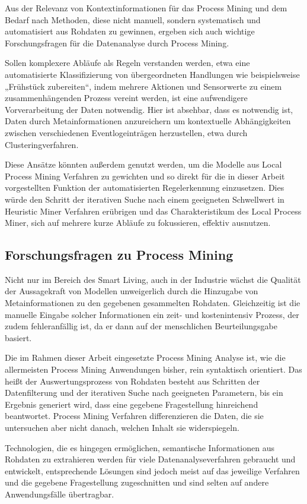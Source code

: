 Aus der Relevanz von Kontextinformationen für das Process Mining und dem Bedarf nach Methoden, diese nicht manuell, sondern systematisch und automatisiert aus Rohdaten zu gewinnen, ergeben sich auch wichtige Forschungsfragen für die Datenanalyse durch Process Mining.

Sollen komplexere Abläufe als Regeln verstanden werden, etwa eine automatisierte Klassifizierung von übergeordneten Handlungen wie beispielsweise „Frühstück zubereiten“, indem mehrere Aktionen und Sensorwerte zu einem zusammenhängenden Prozess vereint werden, ist eine aufwendigere Vorverarbeitung der Daten notwendig. Hier ist absehbar, dass es notwendig ist, Daten durch Metainformationen anzureichern um kontextuelle Abhängigkeiten zwischen verschiedenen Eventlogeinträgen herzustellen, etwa durch Clusteringverfahren. 

Diese Ansätze könnten außerdem genutzt werden, um die Modelle aus Local Process Mining Verfahren zu gewichten und so direkt für die in dieser Arbeit vorgestellten Funktion der automatisierten Regelerkennung einzusetzen. Dies würde den Schritt der iterativen Suche nach einem geeigneten Schwellwert in Heuristic Miner Verfahren erübrigen und das Charakteristikum des Local Process Miner, sich auf mehrere kurze Abläufe zu fokussieren, effektiv ausnutzen.

\subsection{Forschungsfragen zu Process Mining}
Nicht nur im Bereich des Smart Living, auch in der Industrie wächst die Qualität der Aussagekraft von Modellen unweigerlich durch die Hinzugabe von Metainformationen zu den gegebenen gesammelten Rohdaten. Gleichzeitig ist die manuelle Eingabe solcher Informationen ein zeit- und kostenintensiv Prozess, der zudem fehleranfällig ist, da er dann auf der menschlichen Beurteilungsgabe basiert.

Die im Rahmen dieser Arbeit eingesetzte Process Mining Analyse ist, wie die allermeisten Process Mining Anwendungen bisher, rein syntaktisch orientiert. Das heißt der Auswertungsprozess von Rohdaten besteht aus Schritten der Datenfilterung und der iterativen Suche nach geeigneten Parametern, bis ein Ergebnis generiert wird, dass eine gegebene Fragestellung hinreichend beantwortet. Process Mining Verfahren differenzieren die Daten, die sie untersuchen aber nicht danach, welchen Inhalt sie widerspiegeln. 

Technologien, die es hingegen ermöglichen, semantische Informationen aus Rohdaten zu extrahieren werden für viele Datenanalyseverfahren gebraucht und entwickelt, entsprechende Lösungen sind jedoch meist auf das jeweilige Verfahren und die gegebene Fragestellung zugeschnitten und sind selten auf andere Anwendungsfälle übertragbar. 

